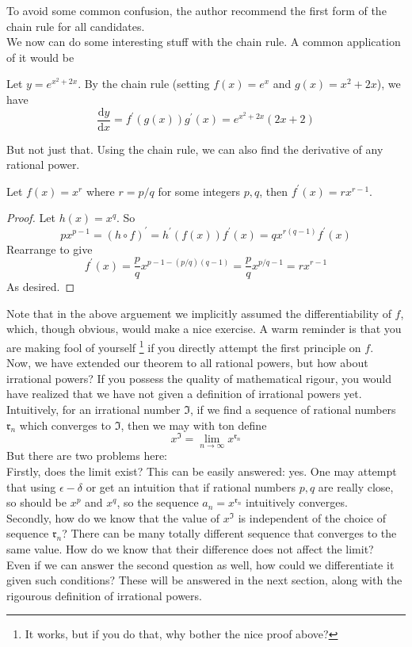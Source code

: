 To avoid some common confusion, the author recommend the first form of the chain rule for all candidates.\\
We now can do some interesting stuff with the chain rule.
A common application of it would be
\begin{example}
    Let $y=e^{x^2+2x}$. By the chain rule (setting $f(x)=e^x$ and $g(x)=x^2+2x$), we have
    $$\frac{\mathrm dy}{\mathrm dx}=f^\prime(g(x))g^\prime(x)=e^{x^2+2x}(2x+2)$$
\end{example}
But not just that.
Using the chain rule, we can also find the derivative of any rational power.
\begin{theorem}
    Let $f(x)=x^r$ where $r=p/q$ for some integers $p,q$, then $f^\prime(x)=rx^{r-1}$.
\end{theorem}
\begin{proof}
    Let $h(x)=x^q$.
    So
    $$px^{p-1}=(h\circ f)^\prime=h^\prime(f(x))f^\prime(x)=qx^{r(q-1)}f^\prime(x)$$
    Rearrange to give
    $$f^\prime(x)=\frac{p}{q}x^{p-1-(p/q)(q-1)}=\frac{p}{q}x^{p/q-1}=rx^{r-1}$$
    As desired.
\end{proof}
Note that in the above arguement we implicitly assumed the differentiability of $f$, which, though obvious, would make a nice exercise.
A warm reminder is that you are making fool of yourself
\footnote{It works, but if you do that, why bother the nice proof above?}
if you directly attempt the first principle on $f$.\\
Now, we have extended our theorem to all rational powers, but how about irrational powers?
If you possess the quality of mathematical rigour, you would have realized that we have not given a definition of irrational powers yet.
Intuitively, for an irrational number $\mathfrak{I}$, if we find a sequence of rational numbers $\mathfrak{r}_n$ which converges to $\mathfrak{I}$, then we may with ton define
$$x^{\mathfrak{I}}=\lim_{n\to\infty}x^{\mathfrak{r}_n}$$
But there are two problems here:\\
Firstly, does the limit exist?
This can be easily answered: yes.
One may attempt that using $\epsilon-\delta$ or get an intuition that if rational numbers $p,q$ are really close, so should be $x^p$ and $x^q$, so the sequence $a_n=x^{\mathfrak{r}_n}$ intuitively converges.\\
Secondly, how do we know that the value of $x^\mathfrak{I}$ is independent of the choice of sequence $\mathfrak{r}_n$?
There can be many totally different sequence that converges to the same value.
How do we know that their difference does not affect the limit?\\
Even if we can answer the second question as well, how could we differentiate it given such conditions?
These will be answered in the next section, along with the rigourous definition of irrational powers. 